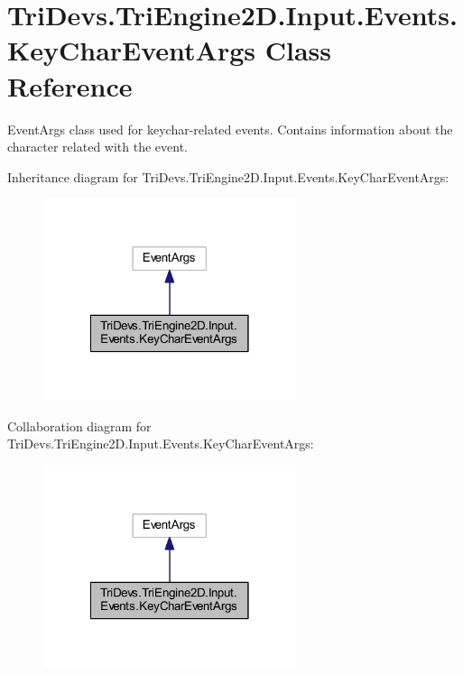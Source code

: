 \hypertarget{class_tri_devs_1_1_tri_engine2_d_1_1_input_1_1_events_1_1_key_char_event_args}{\section{Tri\-Devs.\-Tri\-Engine2\-D.\-Input.\-Events.\-Key\-Char\-Event\-Args Class Reference}
\label{class_tri_devs_1_1_tri_engine2_d_1_1_input_1_1_events_1_1_key_char_event_args}
}


Event\-Args class used for keychar-\/related events. Contains information about the character related with the event.  




Inheritance diagram for Tri\-Devs.\-Tri\-Engine2\-D.\-Input.\-Events.\-Key\-Char\-Event\-Args\-:\nopagebreak
\begin{figure}[H]
\begin{center}
\leavevmode
\includegraphics[width=210pt]{class_tri_devs_1_1_tri_engine2_d_1_1_input_1_1_events_1_1_key_char_event_args__inherit__graph}
\end{center}
\end{figure}


Collaboration diagram for Tri\-Devs.\-Tri\-Engine2\-D.\-Input.\-Events.\-Key\-Char\-Event\-Args\-:\nopagebreak
\begin{figure}[H]
\begin{center}
\leavevmode
\includegraphics[width=210pt]{class_tri_devs_1_1_tri_engine2_d_1_1_input_1_1_events_1_1_key_char_event_args__coll__graph}
\end{center}
\end{figure}
